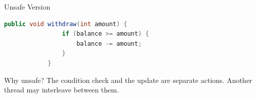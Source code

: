 \documentclass[aspectratio=169,11pt]{beamer}
\begin{document}
	\begin{frame}[fragile]{Unsafe Version}
		\begin{lstlisting}[language=Java]
			public void withdraw(int amount) {
				if (balance >= amount) {
					balance -= amount;
				}
			}
		\end{lstlisting}
		
		\vspace{0.3cm}
		
		\begin{block}{Why unsafe?}
			The condition check and the update are separate actions.
			Another thread may interleave between them.
		\end{block}
	\end{frame}
	
\end{document}
